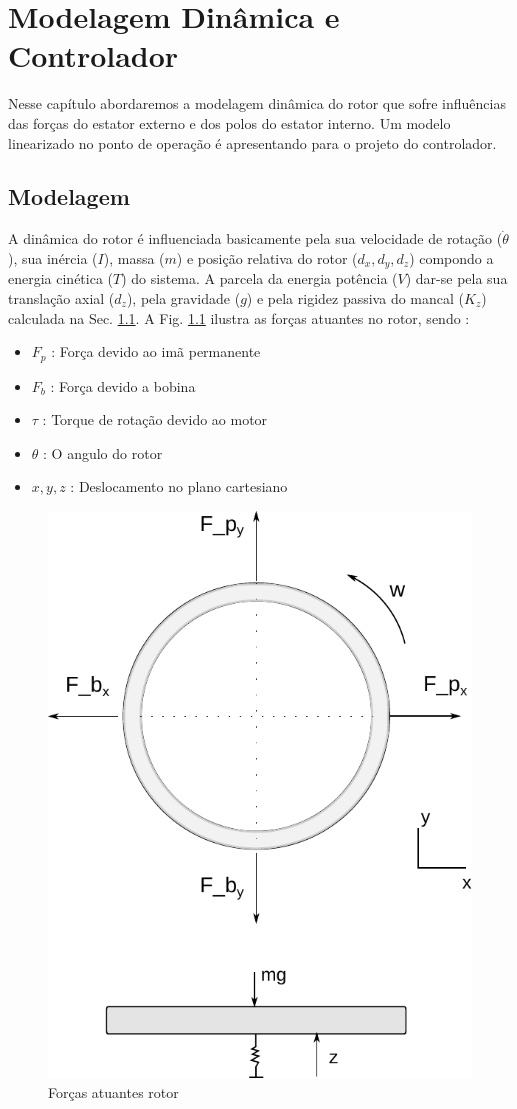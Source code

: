 \pagestyle{empty}
\cleardoublepage
\pagestyle{fancy}

\chapter{Modelagem Dinâmica e Controlador} \label{Cap:Modelagem:Dinamica}

 Nesse capítulo abordaremos a modelagem dinâmica do rotor que sofre influências das forças do estator externo e dos polos do estator interno. Um modelo linearizado no ponto de operação é apresentando para o projeto do controlador.
 
\section{Modelagem}

A dinâmica do rotor é influenciada basicamente pela sua velocidade de rotação ($\dot{\theta}$), sua inércia ($I$), massa ($m$) e posição relativa do rotor ($d_x,d_y,d_z$) compondo a energia cinética ($T$) do sistema. A parcela da energia potência ($V$) dar-se pela  sua translação axial ($d_z$), pela gravidade ($g$) e pela rigidez passiva do mancal ($K_z$) calculada na Sec. \ref{}. A Fig. \ref{fig:modelo:forcas} ilustra as forças atuantes no rotor, sendo :

 \begin{itemize}
 	\item $F_p$ : Força devido ao imã permanente
 	\item $F_b$ : Força devido a bobina
 	\item $\tau$ : Torque de rotação devido ao motor
 	\item $\theta$ : O angulo do rotor
 	\item $x,y,z$ : Deslocamento no plano cartesiano 
 \end{itemize}

 \begin{figure}[th]
 	\centering
 	\includegraphics[width=0.5\linewidth]{../Figs/Modelagem/forcas}
 	\caption{Forças atuantes rotor}
 	\label{fig:modelo:forcas}
 \end{figure}
 
